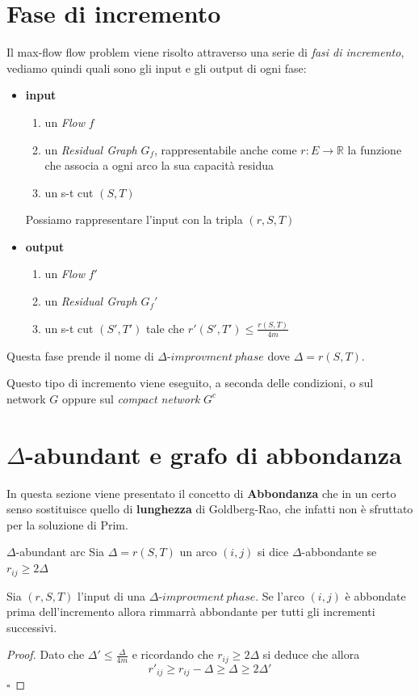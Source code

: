 \documentclass[a4paper, 11pt]{report}
\newcommand*{\QED}{\null\nobreak\hfill\ensuremath{\square}}%
\begin{document}
\section{Fase di incremento}
Il max-flow flow problem viene risolto attraverso una serie di \textit{fasi di incremento}, vediamo quindi quali sono gli input e gli output di ogni fase:
\begin{itemize}[itemsep=0.5ex]
    \item \textbf{input}
    \begin{enumerate}
        \item un \textit{Flow} $f$
        \item un \textit{Residual Graph} $G_f$, rappresentabile anche come $r: E \rightarrow \mathbb{R}$ la funzione che associa a ogni arco la sua capacità residua
        \item un s-t cut $(S,T)$
    \end{enumerate}
    Possiamo rappresentare l'input con la tripla $(r,S,T)$
    \item \textbf{output}
    \begin{enumerate}
        \item un \textit{Flow} $f'$
        \item un \textit{Residual Graph} $G_f'$
        \item un s-t cut $(S',T')$ tale che $r'(S',T') \le \frac{r(S,T)}{4m}$
    \end{enumerate}
\end{itemize}
Questa fase prende il nome di $\Delta\text{-}improvment\ phase$ dove $\Delta = r(S,T)$.

Questo tipo di incremento viene eseguito, a seconda delle condizioni, o sul network $G$ oppure sul \textit{compact network} $G^c$

\section{$\Delta$-abundant e grafo di abbondanza}
In questa sezione viene presentato il concetto di \textbf{Abbondanza} che in un certo senso sostituisce quello di \textbf{lunghezza} di Goldberg-Rao, che infatti non è sfruttato per la soluzione di Prim.
\begin{definition}{$\Delta$-abundant arc}{}
    Sia $\Delta = r(S,T)$ un arco $(i,j)$ si dice $\Delta$-abbondante se $r_{ij} \ge 2\Delta$ 
     
\end{definition}
\begin{lemma}{}{}
    Sia $(r,S,T)$ l'input di una $\Delta\text{-}improvment\ phase$. Se l'arco $(i,j)$ è abbondate prima dell'incremento allora rimmarrà abbondante per tutti gli incrementi successivi.
\end{lemma}
\begin{proof}
    Dato che 
    $\Delta' \le \frac{\Delta}{4m} $ e ricordando che $r_{ij} \ge 2\Delta $ si deduce che 
    allora \[r'_{ij} \ge r_{ij}-\Delta \ge\Delta\ge  2\Delta'\]\QED
\end{proof}
\end{document}
